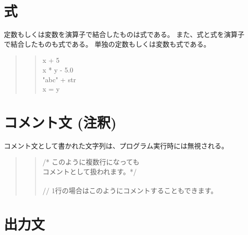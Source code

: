 \documentclass[11pt,a4j]{jarticle}
\begin{document}
\pagebreak

\vspace{-5mm}
\section{式}
定数もしくは変数を演算子で結合したものは式である。
また、式と式を演算子で結合したものも式である。
単独の定数もしくは変数も式である。

\begin{quotation}
\noindent [例]
\begin{quotation}
\noindent x + 5 \\
x * y - 5.0 \\
"abc" + str \\
x = y
\end{quotation}
\end{quotation}


\vspace{-5mm}
\section{コメント文 (注釈)}
\begin{quotation}
\end{quotation}
コメント文として書かれた文字列は、プログラム実行時には無視される。

\begin{quotation}
\noindent [使用例]
\begin{quotation}
\noindent /* このように複数行になっても\\
             コメントとして扱われます。*/ \\
 \\ 
\noindent // 1行の場合はこのようにコメントすることもできます。
\end{quotation}
\end{quotation}


\vspace{-5mm}
\section{出力文}
\end{document}

